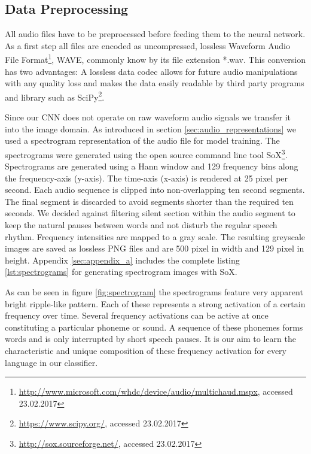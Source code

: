 \subsection{Data Preprocessing}
\label{sec:data_processing}
All audio files have to be preprocessed before feeding them to the neural network. As a first step all files are encoded as uncompressed, lossless Waveform Audio File Format\footnote{\url{http://www.microsoft.com/whdc/device/audio/multichaud.mspx}, accessed 23.02.2017}, WAVE, commonly know by its file extension *.wav. This conversion has two advantages: A lossless data codec allows for future audio manipulations with any quality loss and makes the data easily readable by third party programs and library such as SciPy\footnote{\url{https://www.scipy.org/}, accessed 23.02.2017}. 

	Since our CNN does not operate on raw waveform audio signals we transfer it into the image domain. As introduced in section \ref{sec:audio_representations} we used a spectrogram representation of the audio file for model training. The spectrograms were generated using the open source command line tool SoX\footnote{\url{http://sox.sourceforge.net/}, accessed 23.02.2017}. Spectrograms are generated using a Hann window and 129 frequency bins along the frequency-axis (y-axis). The time-axis (x-axis) is rendered at 25 pixel per second. Each audio sequence is clipped into non-overlapping ten second segments. The  final segment is discarded to avoid segments shorter than the required ten seconds. We decided against filtering silent section within the audio segment to keep the natural pauses between words and not disturb the regular speech rhythm. Frequency intensities are mapped to a gray scale. The resulting greyscale images are saved as lossless PNG files and are 500 pixel in width and 129 pixel in height. Appendix \ref{sec:appendix_a} includes the complete listing \ref{lst:spectrograms} for generating spectrogram images with SoX.
	
	As can be seen in figure \ref{fig:spectrogram} the spectrograms feature very apparent bright ripple-like pattern. Each of these represents a strong activation of a certain frequency over time. Several frequency activations can be active at once constituting a particular phoneme or sound. A sequence of these phonemes forms words and is only interrupted by short speech pauses. It is our aim to learn the characteristic and unique composition of these frequency activation for every language in our classifier. 

